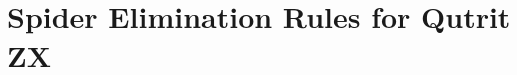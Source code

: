 \documentclass[submission,copyright,creativecommons]{eptcs}
\begin{document}



\appendix




\section{Spider Elimination Rules for Qutrit ZX}



\end{document}
